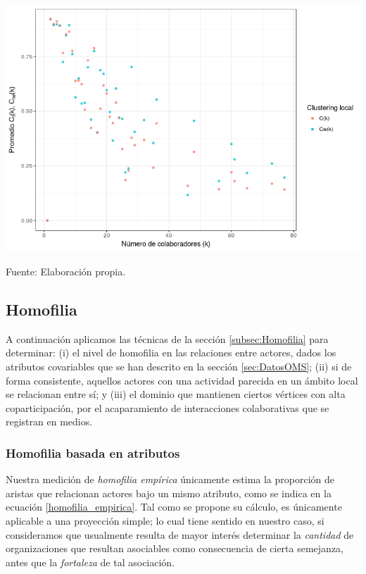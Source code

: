 \documentclass[letterpaper, 11pt]{book}
\theoremstyle{definition}
\theoremstyle{remark}
\begin{document}
\hspace{-1.5em}\begin{minipage}{\linewidth}
\centering
{} \label{5.10_rel_k_Clustering}
\hspace{-0em}\includegraphics[scale=0.8]{img/5.10_rel_k_Clustering.png}
\par\bigskip
\small Fuente: Elaboración propia. 
\end{minipage}\bigskip



\subsection{Homofilia}
\label{subsec:homofilia__proyec}


A continuación aplicamos las técnicas de la sección \ref{subsec:Homofilia} para determinar:  
(i) el nivel de homofilia en las relaciones entre actores, dados los atributos covariables que se han descrito en la sección \ref{sec:DatosOMS}; 
(ii) si de forma consistente, aquellos actores con una actividad parecida en un ámbito local se relacionan entre sí; 
y (iii) el dominio que mantienen ciertos vértices con alta coparticipación, por el acaparamiento de interacciones colaborativas que se registran en medios. 


\subsubsection{Homofilia basada en atributos}
\label{subsubsec:homofiliaAttr__proyec}

Nuestra medición de \emph{homofilia empírica} únicamente estima la proporción de aristas que relacionan actores bajo un mismo atributo, como se indica en la ecuación \ref{homofilia_empirica}. 
Tal como se propone su cálculo, es únicamente aplicable a una proyección simple; lo cual tiene sentido en nuestro caso, si consideramos que usualmente resulta de mayor interés determinar la \emph{cantidad} de organizaciones que resultan asociables como consecuencia de cierta semejanza, antes que la \emph{fortaleza} de tal asociación. 
\end{document}
